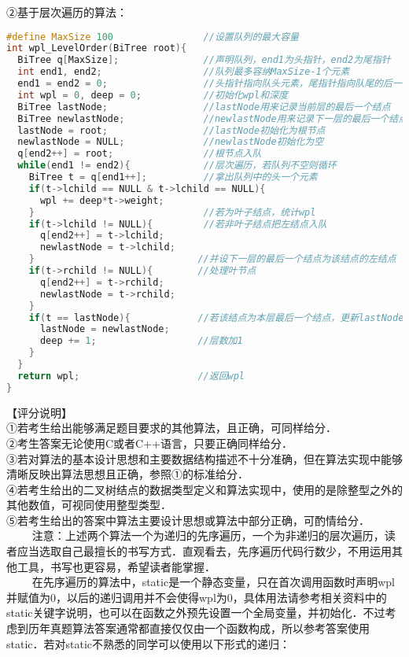 ②基于层次遍历的算法：
\begin{lstlisting}[language=cpp]
#define MaxSize 100                //设置队列的最大容量
int wpl_LevelOrder(BiTree root){
  BiTree q[MaxSize];               //声明队列，end1为头指针，end2为尾指针
  int end1, end2;                  //队列最多容纳MaxSize-1个元素
  end1 = end2 = 0;                 //头指针指向队头元素，尾指针指向队尾的后一个元素
  int wpl = 0, deep = 0;           //初始化wpl和深度
  BiTree lastNode;                 //lastNode用来记录当前层的最后一个结点
  BiTree newlastNode;              //newlastNode用来记录下一层的最后一个结点
  lastNode = root;                 //lastNode初始化为根节点
  newlastNode = NULL;              //newlastNode初始化为空
  q[end2++] = root;                //根节点入队
  while(end1 != end2){             //层次遍历，若队列不空则循环
    BiTree t = q[end1++];          //拿出队列中的头一个元素
    if(t->lchild == NULL & t->lchild == NULL){
      wpl += deep*t->weight;
    }                              //若为叶子结点，统计wpl
    if(t->lchild != NULL){         //若非叶子结点把左结点入队
      q[end2++] = t->lchild;
      newlastNode = t->lchild;
    }                             //并设下一层的最后一个结点为该结点的左结点
    if(t->rchild != NULL){        //处理叶节点
      q[end2++] = t->rchild;
      newlastNode = t->rchild;
    }
    if(t == lastNode){            //若该结点为本层最后一个结点，更新lastNode
      lastNode = newlastNode;
      deep += 1;                  //层数加1
    }
  }
  return wpl;                     //返回wpl
}
\end{lstlisting}
【评分说明】 \\
①若考生给出能够满足题目要求的其他算法，且正确，可同样给分． \\
②考生答案无论使用C或者C++语言，只要正确同样给分． \\
③若对算法的基本设计思想和主要数据结构描述不十分准确，但在算法实现中能够清晰反映出算法思想且正确，参照①的标准给分． \\
④若考生给出的二叉树结点的数据类型定义和算法实现中，使用的是除整型之外的其他数值，可视同使用整型类型． \\
⑤若考生给出的答案中算法主要设计思想或算法中部分正确，可酌情给分． \\
$\qquad$ 注意：上述两个算法一个为递归的先序遍历，一个为非递归的层次遍历，读者应当选取自己最擅长的书写方式．直观看去，先序遍历代码行数少，不用运用其他工具，书写也更容易，希望读者能掌握． \\
$\qquad$ 在先序遍历的算法中，static是一个静态变量，只在首次调用函数时声明wpl并赋值为0，以后的递归调用并不会使得wpl为0，具体用法请参考相关资料中的static关键字说明，也可以在函数之外预先设置一个全局变量，并初始化．不过考虑到历年真题算法答案通常都直接仅仅由一个函数构成，所以参考答案使用static．若对static不熟悉的同学可以使用以下形式的递归：
